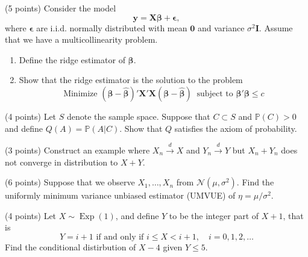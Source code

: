 \documentclass[answers]{exam}
\newcommand{\bs}{\boldsymbol}
\newcommand{\opn}{\operatorname}
\begin{document}
\begin{questions}
\begin{solution}
   \end{solution}
   \begin{solution}

   \end{solution}
   \question
   (5 points) Consider the model
   $$
      \bs{y} = \bs{X\beta} + \bs{\epsilon},
   $$
   where $\bs{\epsilon}$ are i.i.d. normally distributed with mean $\bs{0}$ and variance $\sigma^{2}\bs{I}$. Assume that we have a multicollinearity problem.
   \begin{enumerate}[label=(\alph*)]
      \item Define the ridge estimator of $\bs{\beta}$.
      \item Show that the ridge estimator is the solution to the problem
      $$
      \text{Minimize }\left(\bs{\beta} - \hat{\bs{\beta}}\right)'\bs{X}'\bs{X}\left(\bs{\beta}-\hat{\bs{\beta}}\right)\;\; \text{subject to } \bs{\beta}'\bs{\beta} \leq c
      $$
   \end{enumerate}
   \begin{solution}

   \end{solution}
   \begin{solution}

   \end{solution}
   \question
   (4 points) Let $S$ denote the sample space. Suppose that $C \subset S$ and $\mathbb{P}\left(C\right) >0$ and define $Q\left(A\right) = \mathbb{P}\left(A|C\right)$. Show that $Q$ satisfies the axiom of probability.
   \begin{solution}

   \end{solution}
   \question
   (3 points) Construct an example where $X_{n} \xrightarrow{d} X$ and $Y_{n} \xrightarrow{d} Y$ but $X_{n} + Y_{n}$ does not converge in distribution to $X+Y$.
   \begin{solution}

   \end{solution}
   \question
   (6 points) Suppose that we observe $X_{1}, \ldots , X_{n}$ from $\mathcal{N}\left(\mu, \sigma^{2}\right)$. Find the uniformly minimum variance unbiased estimator (UMVUE) of $\eta = \mu/\sigma^{2}$.
   \begin{solution}

   \end{solution}
   \question
   (4 points) Let $X \sim \opn{Exp}\left(1\right)$, and define $Y$ to be the integer part of $X+1$, that is
   $$
   Y = i + 1 \text{ if and only if } i \leq X < i+1, \quad i = 0, 1, 2, \ldots
   $$
   Find the conditional distirbution of $X-4$ given $Y\leq 5$.
   \begin{solution}


\end{solution}
\end{questions}
\end{document}
